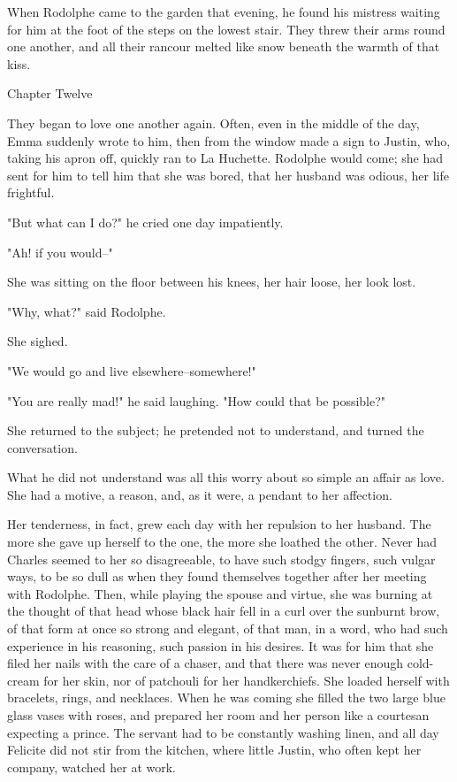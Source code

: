 \documentclass[11pt,twocolumn]{ltugboat}
\begin{document}
When Rodolphe came to the garden that evening, he found his mistress
waiting for him at the foot of the steps on the lowest stair. They threw
their arms round one another, and all their rancour melted like snow
beneath the warmth of that kiss.



Chapter Twelve

They began to love one another again. Often, even in the middle of the
day, Emma suddenly wrote to him, then from the window made a sign to
Justin, who, taking his apron off, quickly ran to La Huchette. Rodolphe
would come; she had sent for him to tell him that she was bored, that
her husband was odious, her life frightful.

"But what can I do?" he cried one day impatiently.

"Ah! if you would--"

She was sitting on the floor between his knees, her hair loose, her look
lost.

"Why, what?" said Rodolphe.

She sighed.

"We would go and live elsewhere--somewhere!"

"You are really mad!" he said laughing. "How could that be possible?"

She returned to the subject; he pretended not to understand, and turned
the conversation.

What he did not understand was all this worry about so simple an affair
as love. She had a motive, a reason, and, as it were, a pendant to her
affection.

Her tenderness, in fact, grew each day with her repulsion to her
husband. The more she gave up herself to the one, the more she loathed
the other. Never had Charles seemed to her so disagreeable, to have
such stodgy fingers, such vulgar ways, to be so dull as when they found
themselves together after her meeting with Rodolphe. Then, while playing
the spouse and virtue, she was burning at the thought of that head whose
black hair fell in a curl over the sunburnt brow, of that form at once
so strong and elegant, of that man, in a word, who had such experience
in his reasoning, such passion in his desires. It was for him that she
filed her nails with the care of a chaser, and that there was never
enough cold-cream for her skin, nor of patchouli for her handkerchiefs.
She loaded herself with bracelets, rings, and necklaces. When he
was coming she filled the two large blue glass vases with roses, and
prepared her room and her person like a courtesan expecting a prince.
The servant had to be constantly washing linen, and all day Felicite
did not stir from the kitchen, where little Justin, who often kept her
company, watched her at work.
\end{document}
